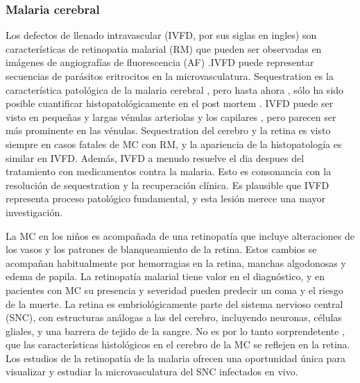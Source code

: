 \subsubsection{Malaria cerebral}

Los defectos de llenado intravascular (IVFD, por sus siglas en ingles) son características de retinopatia malarial (RM) que pueden ser observadas en imágenes de  angiografías de fluorescencia (AF) .IVFD puede representar secuencias de parásitos eritrocitos en la microvasculatura. Sequestration es la característica patológica de la malaria cerebral , pero hasta ahora , sólo ha sido posible cuantificar histopatológicamente en el post mortem . IVFD puede ser visto en pequeñas y largas vénulas arteriolas y los capilares , pero parecen ser más prominente en las vénulas. Sequestration del cerebro y la retina es visto siempre en casos fatales de MC con RM, y la apariencia de la histopatología es similar en IVFD. Además, IVFD a menudo resuelve el dia despues del tratamiento con medicamentos contra la malaria. Esto es consonancia con  la resolución de sequestration y la recuperación clínica. Es plausible que  IVFD representa proceso patológico fundamental, y esta lesión merece una mayor investigación. \cite{zhao2015automated}

La MC en los niños es acompañada de una retinopatía que incluye alteraciones de los vasos  y los patrones de blanqueamiento de la retina. Estos cambios se acompañan habitualmente por hemorragias en la retina, manchas algodonosas y edema de papila. La retinopatía malarial tiene valor en el diagnóstico, y en pacientes con MC su presencia y severidad pueden predecir un coma y el riesgo de la muerte.
La retina es embriológicamente parte del sistema nervioso central (SNC), con estructuras análogas a las del cerebro, incluyendo neuronas, células gliales, y una barrera de tejido de la sangre. No es por lo tanto sorprendetente , que las características histológicos en el cerebro de la MC se reflejen en la retina. Los estudios de la retinopatía de la malaria ofrecen una oportunidad única para visualizar y estudiar la microvasculatura del SNC infectados en vivo.\cite{agurto2016vessel}

